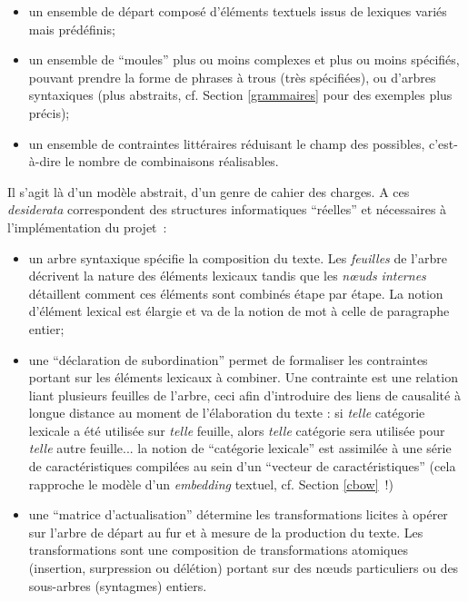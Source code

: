 \documentclass{article}
\begin{document}
					\vspace{2mm}
					\begin{itemize}
						\item un ensemble de départ composé d'éléments textuels issus de lexiques variés mais prédéfinis;
						\item un ensemble de ``moules'' plus ou moins complexes et plus ou moins spécifiés, pouvant prendre la forme de phrases à trous (très spécifiées), ou d'arbres syntaxiques (plus abstraits, cf. Section \ref{grammaires} pour des exemples plus précis);
						\item un ensemble de contraintes littéraires réduisant le champ des possibles, c'est-à-dire le nombre de combinaisons réalisables.
					\end{itemize}
					\vspace{2mm}
					Il s'agit là d'un modèle abstrait, d'un genre de cahier des charges. A ces \textit{desiderata} correspondent des structures informatiques ``réelles'' et nécessaires à l'implémentation du projet~:
					\vspace{2mm}
					\begin{itemize}
						\item un arbre syntaxique spécifie la composition du texte. Les \textit{feuilles} de l'arbre décrivent la nature des éléments lexicaux tandis que les \textit{nœuds internes} détaillent comment ces éléments sont combinés étape par étape. La notion d'élément lexical est élargie et va de la notion de mot à celle de paragraphe entier;
						\item une ``déclaration de subordination'' permet de formaliser les contraintes portant sur les éléments lexicaux à combiner. Une contrainte est une relation liant plusieurs feuilles de l'arbre, ceci afin d'introduire des liens de causalité à longue distance au moment de l'élaboration du texte : si \textit{telle} catégorie lexicale a été utilisée sur \textit{telle} feuille, alors \textit{telle} catégorie sera utilisée pour \textit{telle} autre feuille... la notion de ``catégorie lexicale'' est assimilée à une série de caractéristiques compilées au sein d'un ``vecteur de caractéristiques'' (cela rapproche le modèle d'un \textit{embedding} textuel, cf. Section \ref{cbow}~!)
						\item une ``matrice d'actualisation'' détermine les transformations licites à opérer sur l'arbre de départ au fur et à mesure de la production du texte. Les transformations sont une composition de transformations atomiques (insertion, surpression ou délétion) portant sur des nœuds particuliers ou des sous-arbres (syntagmes) entiers.
					\end{itemize}
\end{document}
